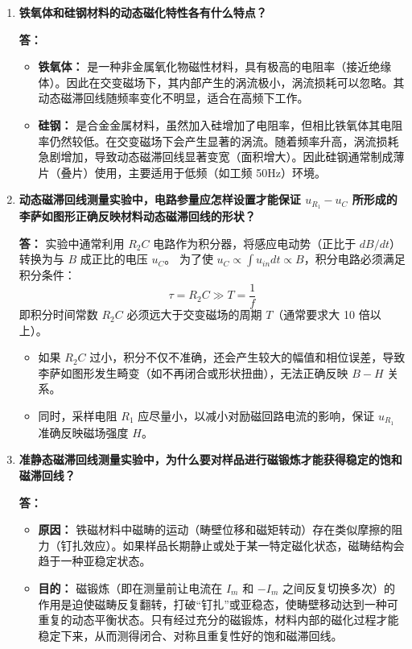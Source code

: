 \documentclass[11pt]{article}
\begin{document}
\begin{enumerate}
    \item \textbf{铁氧体和硅钢材料的动态磁化特性各有什么特点？}
    
    \textbf{答：}
    \begin{itemize}
        \item \textbf{铁氧体：} 是一种非金属氧化物磁性材料，具有极高的电阻率（接近绝缘体）。因此在交变磁场下，其内部产生的涡流极小，涡流损耗可以忽略。其动态磁滞回线随频率变化不明显，适合在高频下工作。
        \item \textbf{硅钢：} 是合金金属材料，虽然加入硅增加了电阻率，但相比铁氧体其电阻率仍然较低。在交变磁场下会产生显著的涡流。随着频率升高，涡流损耗急剧增加，导致动态磁滞回线显著变宽（面积增大）。因此硅钢通常制成薄片（叠片）使用，主要适用于低频（如工频 50Hz）环境。
    \end{itemize}

    \item \textbf{动态磁滞回线测量实验中，电路参量应怎样设置才能保证 $u_{R_1} - u_C$ 所形成的李萨如图形正确反映材料动态磁滞回线的形状？}
    
    \textbf{答：}
    实验中通常利用 $R_2C$ 电路作为积分器，将感应电动势（正比于 $dB/dt$）转换为与 $B$ 成正比的电压 $u_C$。
    为了使 $u_C \propto \int u_{in} dt \propto B$，积分电路必须满足积分条件：
    \[ \tau = R_2 C \gg T = \frac{1}{f} \]
    即积分时间常数 $R_2 C$ 必须远大于交变磁场的周期 $T$（通常要求大 10 倍以上）。
    \begin{itemize}
        \item 如果 $R_2 C$ 过小，积分不仅不准确，还会产生较大的幅值和相位误差，导致李萨如图形发生畸变（如不再闭合或形状扭曲），无法正确反映 $B-H$ 关系。
        \item 同时，采样电阻 $R_1$ 应尽量小，以减小对励磁回路电流的影响，保证 $u_{R_1}$ 准确反映磁场强度 $H$。
    \end{itemize}

    \item \textbf{准静态磁滞回线测量实验中，为什么要对样品进行磁锻炼才能获得稳定的饱和磁滞回线？}
    
    \textbf{答：}
    \begin{itemize}
        \item \textbf{原因：} 铁磁材料中磁畴的运动（畴壁位移和磁矩转动）存在类似摩擦的阻力（钉扎效应）。如果样品长期静止或处于某一特定磁化状态，磁畴结构会趋于一种亚稳定状态。
        \item \textbf{目的：} 磁锻炼（即在测量前让电流在 $I_m$ 和 $-I_m$ 之间反复切换多次）的作用是迫使磁畴反复翻转，打破“钉扎”或亚稳态，使畴壁移动达到一种可重复的动态平衡状态。只有经过充分的磁锻炼，材料内部的磁化过程才能稳定下来，从而测得闭合、对称且重复性好的饱和磁滞回线。
    \end{itemize}

\end{enumerate}
\end{document}
